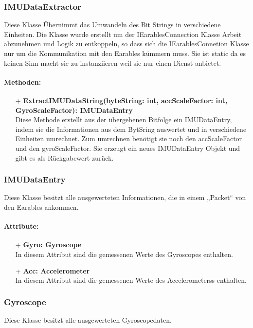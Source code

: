 \documentclass[a4paper,12pt]{article}
\begin{document}
\subsubsection{IMUDataExtractor}
Diese Klasse Übernimmt das Umwandeln des Bit Strings in verschiedene Einheiten.
Die Klasse wurde erstellt um der IEarablesConnection Klasse Arbeit abzunehmen und Logik zu entkoppeln, so dass sich die IEarablesConnetion
 Klasse nur um die Kommunikation mit den Earables kümmern muss. Sie ist static da es keinen Sinn macht sie zu instanziieren weil sie nur einen Dienst anbietet.

\paragraph{Methoden:}
\begin{itemize}
	\item[+] \textbf{ExtractIMUDataString(byteString: int, accScaleFactor: int, GyroScaleFactor): IMUDataEntry}\\Diese Methode erstellt aus der übergebenen Bitfolge ein IMUDataEntry, indem sie die Informationen aus dem BytSring auswertet und in verschiedene Einheiten umrechnet. Zum umrechnen benötigt sie noch den accScaleFactor und den gyroScaleFactor. Sie erzeugt ein neues IMUDataEntry Objekt und gibt es als Rückgabewert zurück.
\end{itemize}


\subsubsection{IMUDataEntry}
Diese Klasse besitzt alle ausgewerteten Informationen, die in einem „Packet“ von den Earables ankommen.

\paragraph{Attribute:}
\begin{itemize}
	\item[+] \textbf{Gyro: Gyroscope}\\In diesem Attribut sind die gemessenen Werte des Gyroscopes enthalten.
	\item[+] \textbf{Acc: Accelerometer}\\In diesem Attribut sind die gemessenen Werte des Accelerometerss enthalten.
\end{itemize}


\subsubsection{Gyroscope}
Diese Klasse besitzt alle ausgewerteten Gyroscopedaten.
\end{document}
